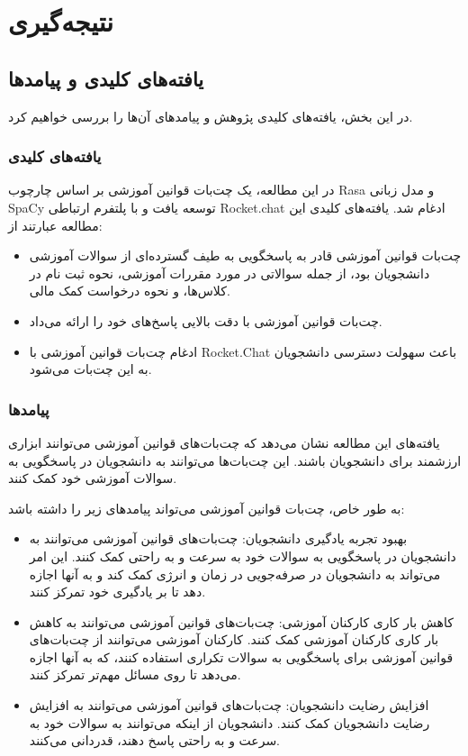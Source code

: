\chapter{نتیجه‌گیری}

\section{یافته‌های کلیدی و پیامدها}

در این بخش، یافته‌های کلیدی پژوهش و پیامدهای آن‌ها را بررسی خواهیم کرد.

\subsection{یافته‌های کلیدی}

در این مطالعه، یک چت‌بات قوانین آموزشی بر اساس چارچوب Rasa و مدل زبانی SpaCy توسعه یافت و با پلتفرم ارتباطی Rocket.chat ادغام شد. یافته‌های کلیدی این مطالعه عبارتند از:

\begin{itemize}
    \item چت‌بات قوانین آموزشی قادر به پاسخگویی به طیف گسترده‌ای از سوالات آموزشی دانشجویان بود، از جمله سوالاتی در مورد مقررات آموزشی، نحوه ثبت نام در کلاس‌ها، و نحوه درخواست کمک مالی.
    \item چت‌بات قوانین آموزشی با دقت بالایی پاسخ‌های خود را ارائه می‌داد.
    \item ادغام چت‌بات قوانین آموزشی با Rocket.Chat باعث سهولت دسترسی دانشجویان به این چت‌بات می‌شود.
\end{itemize}

\subsection{پیامدها}

یافته‌های این مطالعه نشان می‌دهد که چت‌بات‌های قوانین آموزشی می‌توانند ابزاری ارزشمند برای دانشجویان باشند. این چت‌بات‌ها می‌توانند به دانشجویان در پاسخگویی به سوالات آموزشی خود کمک کنند.

به طور خاص، چت‌بات قوانین آموزشی می‌تواند پیامدهای زیر را داشته باشد:

\begin{itemize}
    \item بهبود تجربه یادگیری دانشجویان: چت‌بات‌های قوانین آموزشی می‌توانند به دانشجویان در پاسخگویی به سوالات خود به سرعت و به راحتی کمک کنند. این امر می‌تواند به دانشجویان در صرفه‌جویی در زمان و انرژی کمک کند و به آنها اجازه دهد تا بر یادگیری خود تمرکز کنند.
    \item کاهش بار کاری کارکنان آموزشی: چت‌بات‌های قوانین آموزشی می‌توانند به کاهش بار کاری کارکنان آموزشی کمک کنند. کارکنان آموزشی می‌توانند از چت‌بات‌های قوانین آموزشی برای پاسخگویی به سوالات تکراری استفاده کنند، که به آنها اجازه می‌دهد تا روی مسائل مهم‌تر تمرکز کنند.
    \item افزایش رضایت دانشجویان: چت‌بات‌های قوانین آموزشی می‌توانند به افزایش رضایت دانشجویان کمک کنند. دانشجویان از اینکه می‌توانند به سوالات خود به سرعت و به راحتی پاسخ دهند، قدردانی می‌کنند.
\end{itemize}


